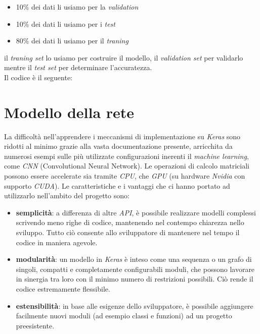\begin{itemize}
	\item 10\% dei dati li usiamo per la \textit{validation}
	\item 10\% dei dati li usiamo per i \textit{test}
	\item 80\% dei dati li usiamo per il \textit{traning}
\end{itemize}
il \textit{traning set} lo usiamo per costruire il modello, il \textit{validation set} per validarlo mentre il \textit{test set} per determinare l'accuratezza.\\
\newline
Il codice è il seguente:
\vspace*{2ex}
\vspace*{2ex}
\section{Modello della rete}
La difficoltà nell’apprendere i meccanismi di implementazione su \textit{Keras} sono ridotti al minimo grazie alla vasta documentazione presente, arricchita da numerosi esempi sulle più utilizzate configurazioni inerenti il \textit{machine learning}, come \textit{CNN} (Convolutional Neural Network).
Le operazioni di calcolo matriciali possono essere accelerate sia tramite \textit{CPU}, che \textit{GPU} (su hardware \textit{Nvidia} con supporto \textit{CUDA}).
Le caratteristiche e i vantaggi che ci hanno portato ad utilizzarlo nell’ambito del progetto sono:
\begin{itemize}
	\item \textbf{semplicità}: a differenza di altre \textit{API}, è possibile realizzare modelli complessi scrivendo meno righe di codice, mantenendo nel contempo chiarezza nello sviluppo. Tutto ciò consente allo sviluppatore di mantenere nel tempo il codice in maniera agevole.
	\item \textbf{modularità}: un modello in \textit{Keras} è inteso come una sequenza o un grafo di singoli, compatti e completamente configurabili moduli, che possono lavorare in sinergia tra loro con il minimo numero di restrizioni possibili. Ciò rende il codice estremamente flessibile.
	\item \textbf{estensibilità}: in base alle esigenze dello sviluppatore, è possibile aggiungere facilmente nuovi moduli (ad esempio classi e funzioni) ad un progetto preesistente.
\end{itemize}
